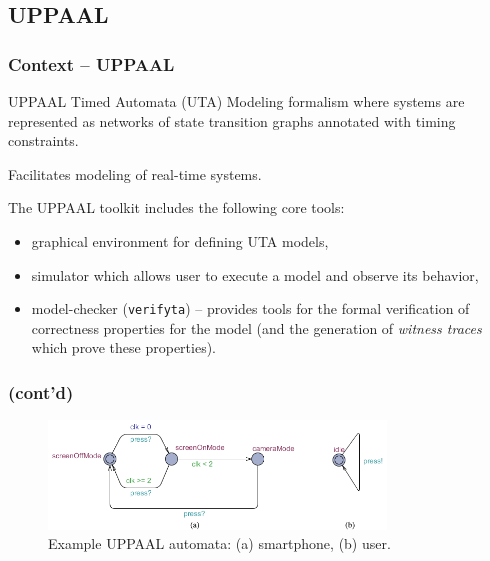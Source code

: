 \documentclass{beamer}
\makeatletter
\def\grenewcommand{\g@star@or@long\renew@command}
\def\g@star@or@long#1{%
      \@ifstar{\let\l@ngrel@x\global#1}{\def\l@ngrel@x{\long\global}#1}}
\newcommand{\recallframetitle}{}
\newcommand{\storeframetitle}[1]{%
    \grenewcommand{\recallframetitle}{#1}%
}
\newcommand{\frametitlestore}[1]{
    \frametitle{#1}%
    \storeframetitle{#1}%
}
\newcommand{\frametitlecont}{%
    \frametitle{\recallframetitle{} (cont'd)}%
}
\newcommand{\monofont}[1]{{\footnotesize \texttt{#1}}}
\newenvironment{definitionboxnopause}[1][]
    {\begin{block}{#1}}
    {\end{block}}
\makeatother
\begin{document}
    \subsection{UPPAAL}
    \begin{frame}
        \frametitlestore{Context -- UPPAAL}
        \begin{definitionboxnopause}[UPPAAL Timed Automata (UTA)]
            Modeling formalism where systems are represented as networks of state transition graphs annotated with timing constraints.
        \end{definitionboxnopause}
        \pause
        \bigskip
        \par Facilitates modeling of real-time systems.
        \pause
        \bigskip
        \par The UPPAAL toolkit includes the following core tools:
        \pause
        \begin{itemize}[<+->]
            \item graphical environment for defining UTA models,
            \item simulator which allows user to execute a model and observe its behavior,
            \item model-checker (\monofont{verifyta}) -- provides tools for the formal verification of correctness properties for the model (and the generation of \textit{witness traces} which prove these properties).
        \end{itemize}
    \end{frame}

    \begin{frame}
        \frametitlecont{}
        \begin{figure}
            \includegraphics[width=0.8\textwidth]{images/presentation/ExampleUPPAALAutomata.png}
            \caption{Example UPPAAL automata: (a) smartphone, (b) user.}
            \label{fig:uppaal_example}
        \end{figure}
    \end{frame}
\end{document}
